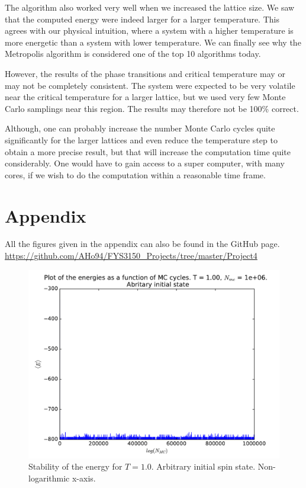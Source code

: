 \documentclass[12pt]{article}
\begin{document}
The algorithm also worked very well when we increased the lattice size. We saw that the computed energy were indeed larger for a larger temperature. This agrees with our physical intuition, where a system with a higher temperature is more energetic than a system with lower temperature. We can finally see why the Metropolis algorithm is considered one of the top 10 algorithms today.

However, the results of the phase transitions and critical temperature may or may not be completely consistent. The system were expected to be very volatile near the critical temperature for a larger lattice, but we used very few Monte Carlo samplings near this region. The results may therefore not be 100\% correct.

Although, one can probably increase the number Monte Carlo cycles quite significantly for the larger lattices and even reduce the temperature step to obtain a more precise result, but that will increase the computation time quite considerably. One would have to gain access to a super computer, with many cores, if we wish to do the computation within a reasonable time frame.
\FloatBarrier

\section{Appendix}
All the figures given in the appendix can also be found in the GitHub page.
\url{https://github.com/AHo94/FYS3150_Projects/tree/master/Project4}
\begin{figure}[H]
\centering
\includegraphics[width=\linewidth]{Plots/Energy_stability_T1.pdf}
\caption{Stability of the energy for $T = 1.0$. Arbitrary initial spin state. Non-logarithmic x-axis.}
\end{figure}
\end{document}
